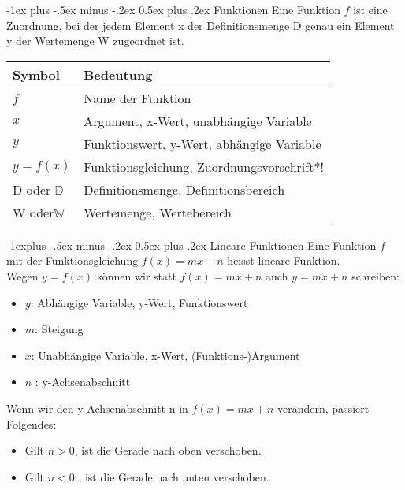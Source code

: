 \documentclass[10pt,landscape]{article}
\makeatletter
\renewcommand{\section}{\@startsection{section}{1}{0mm}%
                                {-1ex plus -.5ex minus -.2ex}%
                                {0.5ex plus .2ex}%
                                {\normalfont\large\bfseries}}
\renewcommand{\subsection}{\@startsection{subsection}{2}{0mm}%
                                {-1explus -.5ex minus -.2ex}%
                                {0.5ex plus .2ex}%
                                {\normalfont\normalsize\bfseries}}
\makeatother
\begin{document}
\begin{multicols}{3}
    \section{Funktionen}
    Eine Funktion $f$ ist eine Zuordnung, bei der jedem Element x der Definitionsmenge D genau ein Element y der Wertemenge W zugeordnet ist.
    \begin{tabular}{l|l}
        \textbf{Symbol}     & \textbf{Bedeutung}                         \\ \hline
        $f$                 & Name der Funktion                          \\ \hline
        $x$                 & Argument, x-Wert, unabhängige Variable     \\  \hline
        $y$                 & Funktionswert, y-Wert, abhängige Variable  \\  \hline
        $y = f(x)$          & Funktionsgleichung, Zuordnungsvorschrift*! \\ \hline
        D oder $\mathbb{D}$ & Definitionsmenge, Definitionsbereich       \\  \hline
        W oder$\mathbb{W}$  & Wertemenge, Wertebereich                   \\  \hline
    \end{tabular}
    \subsection{Lineare Funktionen}
    Eine Funktion $f$ mit der Funktionsgleichung $f(x) = mx + n$ heisst lineare Funktion. \\
    Wegen $y = f(x)$ können wir statt $f(x) = mx + n$ auch $y = mx + n$ schreiben:
    \begin{itemize}
        \item $y$: Abhängige Variable, y-Wert, Funktionswert
        \item $m$: Steigung
        \item  $x$: Unabhängige Variable, x-Wert, (Funktions-)Argument
        \item $n$ : y-Achsenabschnitt
    \end{itemize}
    Wenn wir den y-Achsenabschnitt n in $f(x) = mx + n$ verändern, passiert Folgendes:
    \begin{itemize}
        \item Gilt $n > 0$, ist die Gerade nach oben verschoben.
        \item Gilt $n < 0$ , ist die Gerade nach unten verschoben.
    \end{itemize}


\end{multicols}
\end{document}
